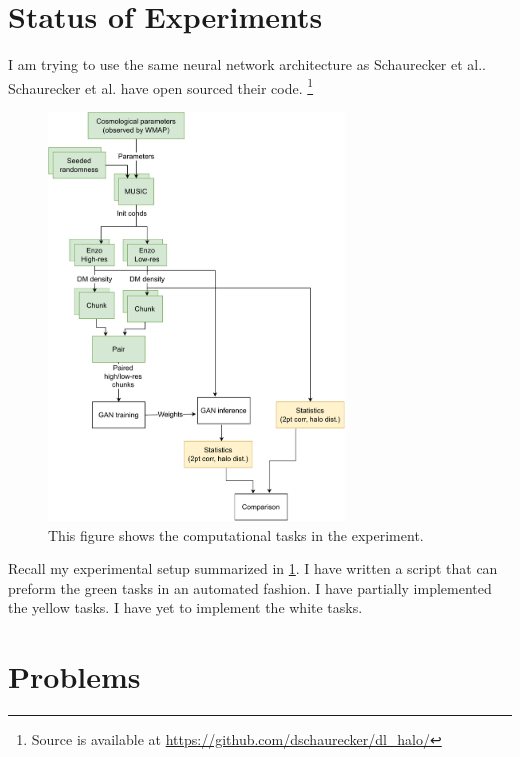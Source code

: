 \section{Status of Experiments}

I am trying to use the same neural network architecture as Schaurecker et al.\cite{schaurecker_super-resolving_2021}. Schaurecker et al. have open sourced their code. \footnote{Source is available at \url{https://github.com/dschaurecker/dl_halo/}}

\begin{figure}[h!]
  \begin{centering}
    \includegraphics[width=0.7\textwidth]{./astrophysics-experiment-status.pdf}
  \end{centering}
  \caption{This figure shows the computational tasks in the experiment.}
  \label{workflow}
\end{figure}

Recall my experimental setup summarized in \cref{workflow}. I have written a script that can preform the green tasks in an automated fashion. I have partially implemented the yellow tasks. I have yet to implement the white tasks.

\section{Problems}

